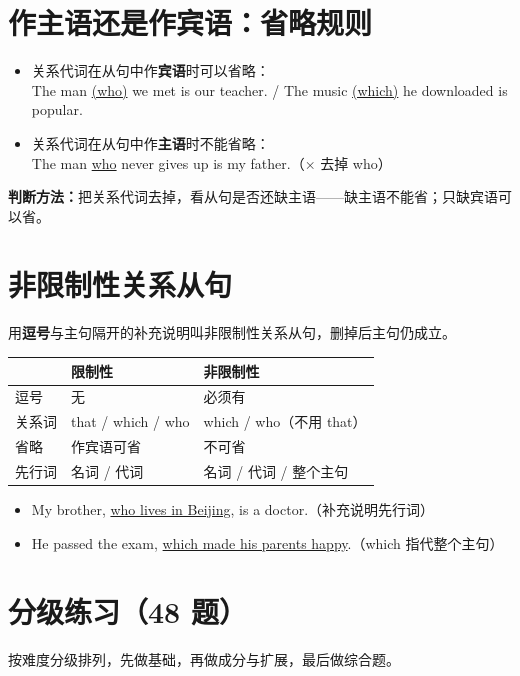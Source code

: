 \documentclass[11pt,a4paper]{ctexart}
\begin{document}
\section{作主语还是作宾语：省略规则}
\begin{itemize}[leftmargin=1.4em]
\item 关系代词在从句中作\textbf{宾语}时可以省略：\\
The man \underline{(who)} we met is our teacher. / The music \underline{(which)} he downloaded is popular.
\item 关系代词在从句中作\textbf{主语}时不能省略：\\
The man \underline{who} never gives up is my father.（× 去掉 who）
\end{itemize}
\textbf{判断方法：}把关系代词去掉，看从句是否还缺主语——缺主语不能省；只缺宾语可以省。

\section{非限制性关系从句}
用\textbf{逗号}与主句隔开的补充说明叫非限制性关系从句，删掉后主句仍成立。
\begin{center}
\begin{tabular}{p{2.6cm}p{5.4cm}p{5.4cm}}
\hline
 & \textbf{限制性} & \textbf{非限制性}\\
\hline
逗号 & 无 & 必须有\\
关系词 & that / which / who & which / who（不用 that）\\
省略 & 作宾语可省 & 不可省\\
先行词 & 名词 / 代词 & 名词 / 代词 / 整个主句\\
\hline
\end{tabular}
\end{center}
\begin{itemize}[leftmargin=1.4em]
\item My brother, \underline{who lives in Beijing}, is a doctor.（补充说明先行词）
\item He passed the exam, \underline{which made his parents happy}.（which 指代整个主句）
\end{itemize}


\newpage
\section{分级练习（48 题）}
\noindent 按难度分级排列，先做基础，再做成分与扩展，最后做综合题。
\end{document}

